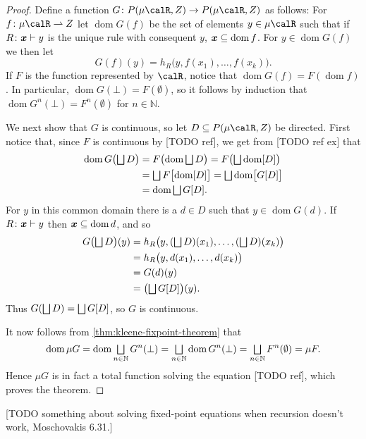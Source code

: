 \documentclass[a4paper, 11pt, article, danish, oneside]{memoir}
\newcommand{\naturals}{\mathbb{N}}
\DeclarePairedDelimiter{\auxdelimbracket}{[}{]}
\DeclareMathOperator*{\smallbigsqcup}{\textstyle\bigsqcup}
\DeclareMathOperator*{\bigdjoin}{\mathchoice
    {\smallbigsqcup}%
    {\bigsqcup}%
    {\bigsqcup}%
    {\bigsqcup}%
}
\newcommand{\image}[2][]{\auxdelimbracket[#1]{#2}}
\newcommand{\pto}{\rightharpoonup}
\newcommand{\dom}{\operatorname{dom}}
\newcommand{\pmaps}[3][]{%
    \ifstrempty{#1}%
        {%
            P(#2,#3)
        }{%
            P_{#1}(#2,#3)
        }%
}
\begin{document}
\begin{proof}
    Define a function $G \colon \pmaps{\mu\calR}{Z} \to \pmaps{\mu\calR}{Z}$ as follows: For $f \colon \mu\calR \pto Z$ let $\dom G(f)$ be the set of elements $y \in \mu\calR$ such that if $\myinfrule{R}{\seq{x}}{y}$ is the unique rule with consequent $y$, $\seq{x} \subseteq \dom f$. For $y \in \dom G(f)$ we then let
    \begin{equation*}
        G(f)(y)
            = h_R \bigl( y, f(x_1), \ldots, f(x_k) \bigr).
    \end{equation*}
    If $F$ is the function represented by $\calR$, notice that $\dom G(f) = F(\dom f)$. In particular, $\dom G(\bot) = F(\emptyset)$, so it follows by induction that $\dom G^n(\bot) = F^n(\emptyset)$ for $n \in \naturals$.

    We next show that $G$ is continuous, so let $D \subseteq \pmaps{\mu\calR}{Z}$ be directed. First notice that, since $F$ is continuous by [TODO ref], we get from [TODO ref ex] that
    \begin{align*}
        \dom G \bigl( \bigdjoin D \bigr)
            &= F \bigl( \dom \bigdjoin D \bigr)
             = F \bigl( \bigdjoin \dom \image{D} \bigr) \\
            &= \bigdjoin F\image[\big]{\dom \image{D}}
             = \bigdjoin \dom \image[\big]{G\image{D}} \\
            &= \dom \bigdjoin G\image{D}.
    \end{align*}
    For $y$ in this common domain there is a $d \in D$ such that $y \in \dom G(d)$. If $\myinfrule{R}{\seq{x}}{y}$ then $\seq{x} \subseteq \dom d$, and so
    \begin{align*}
        G \bigl( \bigdjoin D \bigr) (y)
            &= h_R \bigl( y, (\bigdjoin D)(x_1), \ldots, (\bigdjoin D)(x_k) \bigr) \\
            &= h_R \bigl( y, d(x_1), \ldots, d(x_k) \bigr) \\
            &= G(d)(y) \\
            &= \bigl( \bigdjoin G\image{D} \bigr) (y).
    \end{align*}
    Thus $G(\bigdjoin D) = \bigdjoin G\image{D}$, so $G$ is continuous.
    
    It now follows from \cref{thm:kleene-fixpoint-theorem} that
    \begin{equation*}
        \dom \mu G
            = \dom \bigdjoin_{n \in \naturals} G^n(\bot)
            = \bigdjoin_{n \in \naturals} \dom G^n(\bot)
            = \bigdjoin_{n \in \naturals} F^n(\emptyset)
            = \mu F.
    \end{equation*}
    Hence $\mu G$ is in fact a total function solving the equation [TODO ref], which proves the theorem.
\end{proof}
%
[TODO something about solving fixed-point equations when recursion doesn't work, Moschovakis 6.31.]
\end{document}
